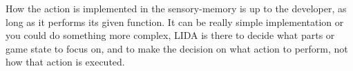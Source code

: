 How the action is implemented in the sensory-memory is up to the developer, as long as it performs its given function. It can be really simple implementation or you could do something more complex, LIDA is there to decide what parts or game state to focus on, and to make the decision on what action to perform, not how that action is executed.
